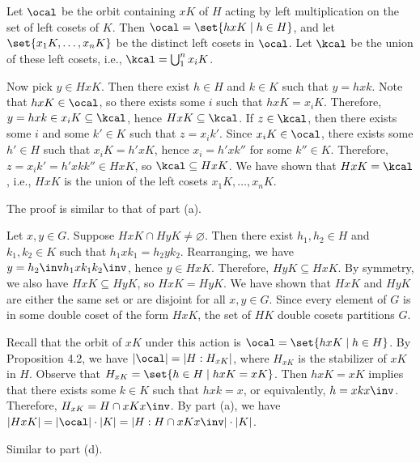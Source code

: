 \begin{solenum}[spsol]
	\item Let $\ocal$ be the orbit containing $xK$ of $H$ acting by left multiplication on the set of left cosets of $K$.
	Then $\ocal = \set{hxK \mid h \in H}$, and let $\set{x_1K, \ldots, x_nK}$ be the distinct left cosets in $\ocal$.
	Let $\kcal$ be the union of these left cosets, i.e., $\kcal = \bigcup_1^n x_iK$.
	
	Now pick $y \in HxK$.
	Then there exist $h \in H$ and $k \in K$ such that $y = hxk$.
	Note that $hxK \in \ocal$, so there exists some $i$ such that $hxK = x_iK$.
	Therefore, $y = hxk \in x_iK \subseteq \kcal$, hence $HxK \subseteq \kcal$.
	If $z \in \kcal$, then there exists some $i$ and some $k' \in K$ such that $z = x_ik'$.
	Since $x_iK \in \ocal$, there exists some $h' \in H$ such that $x_iK = h'xK$, hence $x_i = h'xk''$ for some $k'' \in K$.
	Therefore, $z = x_ik' = h'xkk'' \in HxK$, so $\kcal \subseteq HxK$.
	We have shown that $HxK = \kcal$, i.e., $HxK$ is the union of the left cosets $x_1K, \ldots, x_nK$.
	\item The proof is similar to that of part (a). 
	\item Let $x, y \in G$.
	Suppose $HxK \cap HyK \neq \varnothing$.
	Then there exist $h_1, h_2 \in H$ and $k_1, k_2 \in K$ such that $h_1 x k_1 = h_2 y k_2$.
	Rearranging, we have $y = h_2\inv h_1 x k_1 k_2\inv$, hence $y \in HxK$.
	Therefore, $HyK \subseteq HxK$.
	By symmetry, we also have $HxK \subseteq HyK$, so $HxK = HyK$.
	We have shown that $HxK$ and $HyK$ are either the same set or are disjoint for all $x, y \in G$.
	Since every element of $G$ is in some double coset of the form $HxK$, the set of $HK$ double cosets partitions $G$.
	\item Recall that the orbit of $xK$ under this action is $\ocal = \set{hxK \mid h \in H}$.
	By Proposition 4.2, we have $|\ocal| = |H : H_{xK}|$, where $H_{xK}$ is the stabilizer of $xK$ in $H$.
	Observe that $H_{xK} = \set{h \in H \mid hxK = xK}$.
	Then $hxK = xK$ implies that there exists some $k \in K$ such that $hxk = x$, or equivalently, $h = x k x\inv$.
	Therefore, $H_{xK} = H \cap x K x\inv$.
	By part (a), we have $|HxK| = |\ocal| \cdot |K| = |H : H \cap x K x\inv| \cdot |K|$.
	\item Similar to part (d).
\end{solenum}